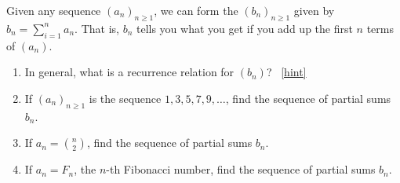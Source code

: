 \documentclass{book}
\begin{document}
\setcounter{project}{145}
\addtocounter{project}{-1}
\begin{activity}[]\label{activity-138}
\hypertarget{p-982}{}%
Given any sequence \((a_n)_{n \ge 1}\), we can form the  \((b_n)_{n \ge 1}\) given by \(b_n = \sum_{i = 1}^n a_n\).  That is, \(b_n\) tells you what you get if you add up the first \(n\) terms of \((a_n)\).%
\begin{enumerate}[font=\bfseries,label=(\alph*),ref=\alph*]
\item\label{task-176} \hypertarget{p-983}{}%
In general, what is a recurrence relation for \((b_n)\)?%
~\hfill{\tiny\hyperlink{a-145.a}{[hint]}\hypertarget{q-145.a}{}}\item\label{task-177} \hypertarget{p-985}{}%
If \((a_n)_{n \ge 1}\) is the sequence \(1, 3, 5, 7, 9, \ldots\), find the sequence of partial sums \(b_n\).%
\item\label{task-178} \hypertarget{p-986}{}%
If \(a_n = \binom{n}{2}\), find the sequence of partial sums \(b_n\).%
\item\label{task-179} \hypertarget{p-987}{}%
If \(a_n = F_n\), the \(n\)-th Fibonacci number, find the sequence of partial sums \(b_n\).%
\end{enumerate}
\end{activity}
\end{document}
